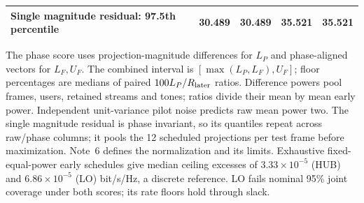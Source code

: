 \documentclass[10pt,letterpaper]{article}
\begin{document}
\begin{table}[htbp]
\begin{tabular}{lllll}
Single magnitude residual: 97.5th percentile & 30.489 & 30.489 & 35.521 & 35.521\\
\bottomrule\end{tabular}
\par\medskip\begin{minipage}{\linewidth}\small
The phase score uses projection-magnitude differences for $L_P$ and phase-aligned vectors for $L_F,U_F$. The combined interval is $[\max(L_P,L_F),U_F]$; floor percentages are medians of paired $100L_P/R_{\rm later}$ ratios. Difference powers pool frames, users, retained streams and tones; ratios divide their mean by mean early power. Independent unit-variance pilot noise predicts raw mean power two. The single magnitude residual is phase invariant, so its quantiles repeat across raw/phase columns; it pools the 12 scheduled projections per test frame before maximization. Note~6 defines the normalization and its limits. Exhaustive fixed-equal-power early schedules give median ceiling excesses of $3.33\times10^{-5}$ (HUB) and $6.86\times10^{-5}$ (LO) bit/s/Hz, a discrete reference. LO fails nominal 95\% joint coverage under both scores; its rate floors hold through slack.
\end{minipage}
\end{table}
\end{document}
